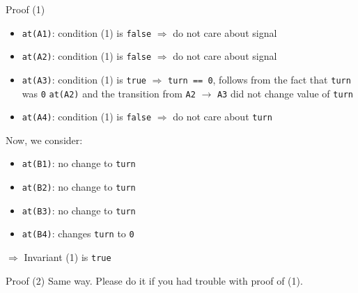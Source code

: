 \begin{frame}{Proof (1)}
  \begin{itemize}
  \item \lstinline!at(A1)!: condition (1) is \lstinline!false!
    $\Rightarrow$ do not care about signal
  \item \lstinline!at(A2)!: condition (1) is \lstinline!false!
    $\Rightarrow$ do not care about signal
  \item \lstinline!at(A3)!: condition (1) is \lstinline!true!
    $\Rightarrow$ \lstinline!turn == 0!, follows from the fact that
    \lstinline!turn!  was \lstinline!0! \lstinline!at(A2)! and the
    transition from \lstinline!A2! $\rightarrow$ \lstinline!A3! did
    not change value of \lstinline!turn!
  \item \lstinline!at(A4)!: condition (1) is \lstinline!false!
    $\Rightarrow$ do not care about \lstinline!turn!
  \end{itemize}

  Now, we consider:

  \begin{itemize}
  \item \lstinline!at(B1)!: no change to \lstinline!turn!
  \item \lstinline!at(B2)!: no change to \lstinline!turn!
  \item \lstinline!at(B3)!: no change to \lstinline!turn!
  \item \lstinline!at(B4)!: changes \lstinline!turn! to \lstinline!0!
  \end{itemize}
  $\Rightarrow$ Invariant (1) is \lstinline!true!
\end{frame}

\begin{frame}{Proof (2)}
  Same way. Please do it if you had trouble with proof of (1).
\end{frame}

